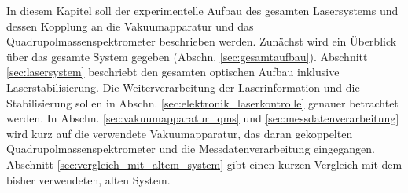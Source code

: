 In diesem Kapitel soll der experimentelle Aufbau des gesamten Lasersystems und
dessen Kopplung an die Vakuumapparatur und das Quadrupolmassenspektrometer
beschrieben werden.
Zunächst wird ein Überblick über das gesamte System gegeben (Abschn.
\ref{sec:gesamtaufbau}). Abschnitt \ref{sec:lasersystem} beschriebt den gesamten
optischen Aufbau inklusive Laserstabilisierung. Die Weiterverarbeitung der
Laserinformation und die Stabilisierung sollen in Abschn.
\ref{sec:elektronik_laserkontrolle} genauer betrachtet werden. In Abschn.
\ref{sec:vakuumapparatur_qms} und \ref{sec:messdatenverarbeitung} wird kurz
auf die verwendete Vakuumapparatur, das daran gekoppelten
Quadrupolmassenspektrometer und die Messdatenverarbeitung eingegangen.
Abschnitt \ref{sec:vergleich_mit_altem_system} gibt einen kurzen Vergleich mit dem
bisher verwendeten, alten System.

